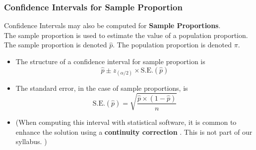 \begin{frame}
\frametitle{Confidence Intervals for Sample Proportion}
Confidence Intervals may also be computed for \textbf{Sample Proportions}. \\The sample proportion is used to estimate the value of a population proportion. The sample proportion is denoted $\hat{p}$. The population proportion is denoted $\pi$.
\begin{itemize}
\item The structure of a confidence interval for sample proportion is
\[ \hat{p} \pm z_{(\alpha/2)} \times \mbox{S.E.}(\hat{p})\]

\item The standard error, in the case of sample proportions, is
\[ \mbox{S.E.}(\hat{p}) = \sqrt{\frac{\hat{p}\times (1-\hat{p})}{n}}\]
\item (When computing this interval with statistical software, it is common to enhance the solution using a \textbf{continuity correction} . This is not part of our syllabus. )
\end{itemize}
\end{frame}
